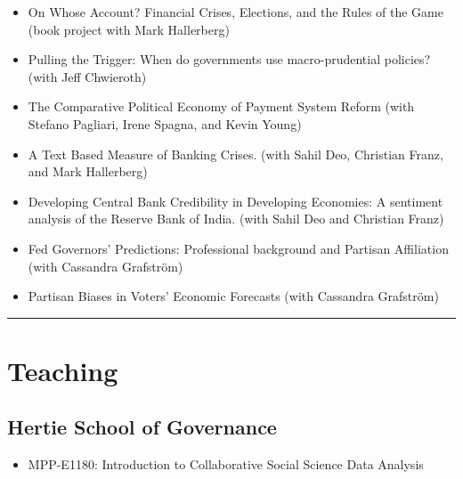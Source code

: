 \documentclass[a4paper]{article}
\begin{document}
{{\begin{itemize}

    \item On Whose Account? Financial Crises, Elections, and the Rules of the Game (book project with Mark Hallerberg)

    \item Pulling the Trigger: When do governments use macro-prudential policies? (with Jeff Chwieroth)

    \item The Comparative Political Economy of Payment System Reform (with Stefano Pagliari, Irene Spagna, and Kevin Young)

    \item A Text Based Measure of Banking Crises. (with Sahil Deo, Christian Franz, and Mark Hallerberg)

    \item Developing Central Bank Credibility in Developing Economies: A sentiment
    analysis of the Reserve Bank of India. (with Sahil Deo and Christian Franz)

    \item Fed Governors' Predictions: Professional background and Partisan Affiliation (with Cassandra Grafstr\"{o}m)

    \item Partisan Biases in Voters' Economic Forecasts (with Cassandra Grafstr\"{o}m)

\end{itemize}


\vspace{0.25cm}
\medskip\hrule height 1pt
\vspace{0.5cm}

\section*{Teaching}

\subsection*{Hertie School of Governance}

\begin{itemize}

    \item MPP-E1180: Introduction to Collaborative Social Science Data Analysis

\end{itemize}

}}
\end{document}
